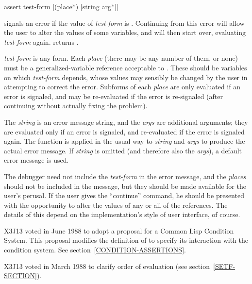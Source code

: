 \begin{defmac}
assert test-form [({place}*) [string {arg}*]]

\begin{obsolete}\noindent
{} signals an error if the value of \emph{test-form} is {\false}.
Continuing 
from this error will allow the user to alter the values of some
variables, and  will then start over, evaluating 
\emph{test-form} again.   returns {\false}.

\emph{test-form} is any form.  Each \emph{place} (there may be any number of
them, or none) must be a generalized-variable reference acceptable to
.  These should be variables on which \emph{test-form} depends,
whose values may sensibly be changed by the user in attempting to correct
the error.  Subforms of each \emph{place} are only evaluated if an error is
signaled, and may be re-evaluated if the error is re-signaled (after
continuing without actually fixing the problem).

The \emph{string} is an
error message string, and the \emph{args} are additional arguments; they are
evaluated only if an error is signaled, and re-evaluated if the error is
signaled again.
The function  is applied in the usual way to
\emph{string} and \emph{args} to produce
the actual error message.  If \emph{string} is omitted (and therefore also
the \emph{args}), a default error message is used.
\end{obsolete}

\beforenoterule
\begin{implementation}
The debugger need not include
the \emph{test-form} in the error message,
and the \emph{places} should not be included in the message, but they
should be made available for the user's perusal.
If the user gives the ``continue'' command, he should be
presented with the opportunity to alter the values of any or all of the
references.  The details of this depend on the
implementation's style of user interface, of course.
\end{implementation}
\afternoterule

\begin{new}
X3J13 voted in June 1988
to adopt a proposal for a Common Lisp Condition System. 
This proposal modifies the definition of  to specify its
interaction with the condition system.  See section~\ref{CONDITION-ASSERTIONS}.
\end{new}

\begin{newer}
X3J13 voted in March 1988 
to clarify order of evaluation (see section~\ref{SETF-SECTION}).
\end{newer}


\end{defmac}
